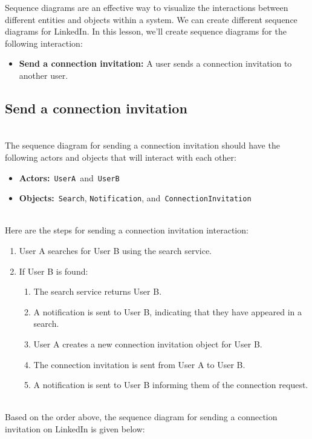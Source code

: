 

Sequence diagrams are an effective way to visualize the interactions between different entities and objects within a system. We can create different sequence diagrams for LinkedIn. In this lesson, we'll create sequence diagrams for the following interaction:

\begin{itemize}
\item
\protect{}\label{aPPYiggvK6JDX1jZ76IMn}
\textbf{Send a connection invitation:} A user sends a connection invitation to another user.
\end{itemize}

\subsection{Send a connection invitation}\label{N5DAhn1RKu-M4SDjz6H0I}
\\
The sequence diagram for sending a connection invitation should have the following actors and objects that will interact with each other:

\begin{itemize}
\item
\protect{}\label{FoKqCJoeMQZz8bhsTu7SU}
\textbf{Actors:}~\texttt{UserA}~and~\texttt{UserB}
\item
\protect{}\label{gXIc8E9bHuWWP_UcfzjtL}
\textbf{Objects:}~\texttt{Search}, \texttt{Notification}, and~\texttt{ConnectionInvitation}
\end{itemize}
\\
Here are the steps for sending a connection invitation interaction:

\begin{enumerate}
\item
User A searches for User B using the search service.
\item
If User B is found:

\begin{enumerate}
\item
The search service returns User B.
\item
A notification is sent to User B, indicating that they have appeared in a search.
\item
User A creates a new connection invitation object for User B.
\item
The connection invitation is sent from User A to User B.
\item
A notification is sent to User B informing them of the connection request.
\end{enumerate}
\end{enumerate}
\\
Based on the order above, the sequence diagram for sending a connection invitation on LinkedIn is given below:

